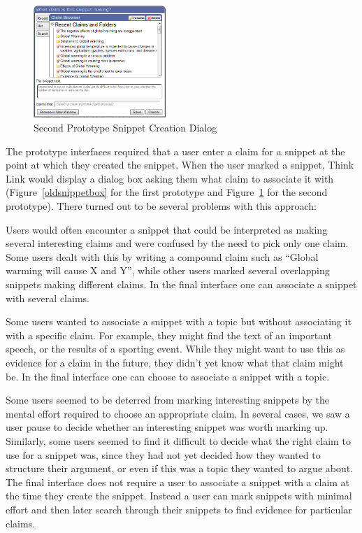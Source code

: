 \documentclass{chi2009}
\begin{document}
\begin{figure}[t]
\begin{center}
	\includegraphics[width=5cm]{../screenshots/newsnip_browseopen.png}
	\caption{Second Prototype Snippet Creation Dialog}
	\label{secondsnippetbox}
\end{center}
\end{figure}

The prototype interfaces required that a user enter a claim for a snippet at the point at which they created the snippet. When the user marked a snippet, Think Link would display a dialog box asking them what claim to associate it with (Figure~\ref{oldsnippetbox} for the first prototype and Figure~\ref{secondsnippetbox} for the second prototype). There turned out to be several problems with this approach:

Users would often encounter a snippet that could be interpreted as making several interesting claims and were confused by the need to pick only one claim. Some users dealt with this by writing a compound claim such as ``Global warming will cause X and Y'', while other users marked several overlapping snippets making different claims. In the final interface one can associate a snippet with several claims.

Some users wanted to associate a snippet with a topic but without associating it with a specific claim. For example, they might find the text of an important speech, or the results of a sporting event. While they might want to use this as evidence for a claim in the future, they didn't yet know what that claim might be. In the final interface one can choose to associate a snippet with a topic.

Some users seemed to be deterred from marking interesting snippets by the mental effort required to choose an appropriate claim. In several cases, we saw a user pause to decide whether an interesting snippet was worth marking up. Similarly, some users seemed to find it difficult to decide what the right claim to use for a snippet was, since they had not yet decided how they wanted to structure their argument, or even if this was a topic they wanted to argue about. The final interface does not require a user to associate a snippet with a claim at the time they create the snippet. Instead a user can mark snippets with minimal effort and then later search through their snippets to find evidence for particular claims.
\end{document}

